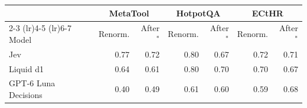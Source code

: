 \begin{tabular}{lrrrrrr}
\toprule
 & \multicolumn{2}{c}{MetaTool} & \multicolumn{2}{c}{HotpotQA} & \multicolumn{2}{c}{ECtHR} \\
\cmidrule(lr){2-3} \cmidrule(lr){4-5} \cmidrule(lr){6-7}
Model & Renorm. & After$^*$ & Renorm. & After$^*$ & Renorm. & After$^*$ \\
\midrule
Jev & 0.77 & 0.72 & 0.80 & 0.67 & 0.72 & 0.71 \\
Liquid d1 & 0.64 & 0.61 & 0.80 & 0.70 & 0.70 & 0.67 \\
GPT-6 Luna Decisions & 0.40 & 0.49 & 0.61 & 0.60 & 0.59 & 0.68 \\
\bottomrule
\end{tabular}
